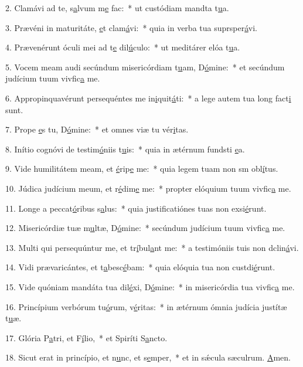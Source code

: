 2. Clamávi ad te, s\uline{a}lvum m\uline{e} fac:~* ut custódiam mandta t\uline{u}a.\par 
3. Prævéni in maturitáte, \uline{e}t clam\uline{á}vi:~* quia in verba tua suprsper\uline{á}vi.\par 
4. Prævenérunt óculi mei ad t\uline{e} dil\uline{ú}culo:~* ut meditárer elóa t\uline{u}a.\par 
5. Vocem meam audi secúndum misericórdiam t\uline{u}am, D\uline{ó}mine:~* et secúndum judícium tuum vivfic\uline{a} me.\par 
6. Appropinquavérunt persequéntes me in\uline{i}quit\uline{á}ti:~* a lege autem tua long fact\uline{i} sunt.\par 
7. Prope \uline{e}s tu, D\uline{ó}mine:~* et omnes viæ tu vér\uline{i}tas.\par 
8. Inítio cognóvi de testim\uline{ó}niis t\uline{u}is:~* quia in ætérnum fundsti \uline{e}a.\par 
9. Vide humilitátem meam, et \uline{é}rip\uline{e} me:~* quia legem tuam non sm obl\uline{í}tus.\par 
10. Júdica judícium meum, et r\uline{é}dim\uline{e} me:~* propter elóquium tuum vivfic\uline{a} me.\par 
11. Longe a peccat\uline{ó}ribus s\uline{a}lus:~* quia justificatiónes tuas non exsi\uline{é}runt.\par 
12. Misericórdiæ tuæ m\uline{u}ltæ, D\uline{ó}mine:~* secúndum judícium tuum vivfic\uline{a} me.\par 
13. Multi qui persequúntur me, et tr\uline{í}bul\uline{a}nt me:~* a testimóniis tuis non dclin\uline{á}vi.\par 
14. Vidi prævaricántes, et t\uline{a}besc\uline{é}bam:~* quia elóquia tua non custdi\uline{é}runt.\par 
15. Vide quóniam mandáta tua dil\uline{é}xi, D\uline{ó}mine:~* in misericórdia tua vivfic\uline{a} me.\par 
16. Princípium verbórum tu\uline{ó}rum, v\uline{é}ritas:~* in ætérnum ómnia judícia justítæ t\uline{u}æ.\par 
17. Glória P\uline{a}tri, et F\uline{í}lio,~* et Spiríti S\uline{a}ncto.\par 
18. Sicut erat in princípio, et n\uline{u}nc, et s\uline{e}mper,~* et in sǽcula sæculrum. \uline{A}men.\par 
